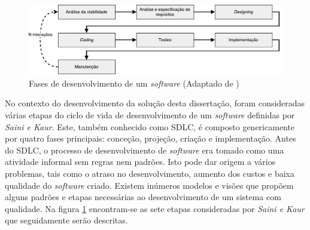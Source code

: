 \begin{figure}[!htb]
	\centering
	\includegraphics[scale=0.6]{esquemas/desenvolvimentoSW.pdf}
	\caption[Fases de desenvolvimento de um \textit{software} ]{Fases de desenvolvimento de um \textit{software} (Adaptado de \cite{Saini2014})}
	\label{sdlcartic}
\end{figure}


No contexto do desenvolvimento da solução desta dissertação, foram consideradas várias etapas do ciclo de vida de desenvolvimento de um \textit{software} definidas por  \textit{Saini e Kaur}\cite{Saini2014}. Este, também conhecido como \ac{SDLC}, é composto genericamente por quatro fases principais: conceção, projeção, criação e implementação. Antes do \ac{SDLC}, o processo de desenvolvimento de \textit{software} era tomado como uma atividade informal sem regras nem padrões. Isto pode dar  origem a vários problemas, tais como o atraso no desenvolvimento, aumento dos custos e baixa qualidade do \textit{software} criado. Existem inúmeros modelos e visões que propõem alguns padrões e etapas necessárias ao desenvolvimento de um sistema com qualidade. Na figura \ref{sdlcartic} encontram-se as sete etapas consideradas por \textit{Saini e Kaur}\cite{Saini2014} que seguidamente serão descritas. 

